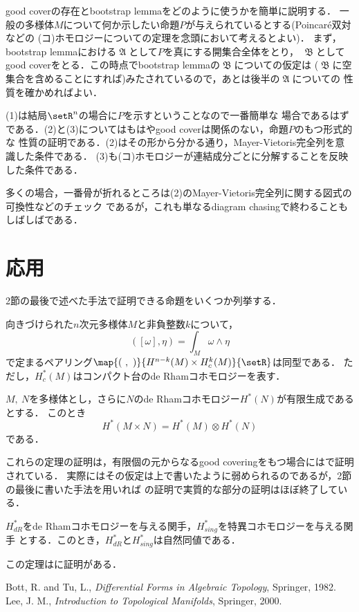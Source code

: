 \documentclass[uplatex]{jsarticle}
\begin{document}
good coverの存在とbootstrap lemmaをどのように使うかを簡単に説明する．
一般の多様体$M$について何か示したい命題$P$が与えられているとする(Poincar\'{e}双対などの
(コ)ホモロジーについての定理を念頭において考えるとよい)．
まず，bootstrap lemmaにおける$\mfrakA$として$P$を真にする開集合全体をとり，
$\mfrakB$としてgood coverをとる．この時点でbootstrap lemmaの$\mfrakB$についての仮定は
($\mfrakB$に空集合を含めることにすれば)みたされているので，あとは後半の$\mfrakA$についての
性質を確かめればよい．

(1)は結局$\setR^n$の場合に$P$を示すということなので一番簡単な
場合であるはずである．(2)と(3)についてはもはやgood coverは関係のない，命題$P$のもつ形式的な
性質の証明である．(2)はその形から分かる通り，Mayer-Vietoris完全列を意識した条件である．
(3)も(コ)ホモロジーが連結成分ごとに分解することを反映した条件である．

多くの場合，一番骨が折れるところは(2)のMayer-Vietoris完全列に関する図式の可換性などのチェック
であるが，これも単なるdiagram chasingで終わることもしばしばである．

\section{応用}
2節の最後で述べた手法で証明できる命題をいくつか列挙する．

\begin{theorem}[de RhamコホモロジーのPoincar\'{e}双対]
  向きづけられた$n$次元多様体$M$と非負整数$k$について，
    \[([\omega],\eta)=\int_M \omega\wedge \eta\]
  で定まるペアリング$\map{(\ ,\ )}{H^{n-k}(M)\times H^k_c(M)}{\setR}$は同型である．
  ただし，$H^\ast_c(M)$はコンパクト台のde Rhamコホモロジーを表す．
\end{theorem}

\begin{theorem}
  $M,\ N$を多様体とし，さらに$N$のde Rhamコホモロジー$H^\ast(N)$が有限生成であるとする．
  このとき
    \[H^\ast(M\times N)=H^\ast(M)\otimes H^\ast(N)\]
  である．  
\end{theorem}

これらの定理の証明は，有限個の元からなるgood coveringをもつ場合には\cite{Bott-Tu}で証明されている．
実際にはその仮定は上で書いたように弱められるのであるが，2節の最後に書いた手法を用いれば
\cite{Bott-Tu}の証明で実質的な部分の証明はほぼ終了している．

\begin{theorem}
  $H_{dR}^\ast$をde Rhamコホモロジーを与える関手，$H_{sing}^\ast$を特異コホモロジーを与える関手
  とする．このとき，$H_{dR}^\ast$と$H_{sing}^\ast$は自然同値である．
\end{theorem}

この定理は\cite{Lee}に証明がある．

\begin{thebibliography}{10}
   Bott, R. and Tu, L., 
    \textit{Differential Forms in Algebraic Topology}, Springer, 1982.
   Lee, J. M., 
    \textit{Introduction to Topological Manifolds}, Springer, 2000.
  
\end{thebibliography}
\end{document}
